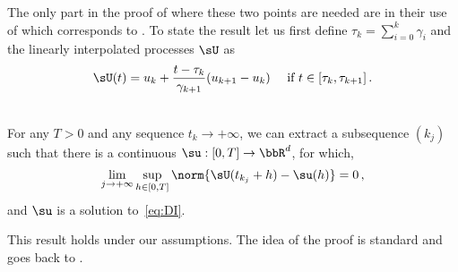 The only part in the proof of \cite[Theorem 3.2]{dav-dru-kak-lee-19} where these two points are needed are in their use of \cite[Theorem 3.1]{dav-dru-kak-lee-19} which corresponds to \cite[Theorem 3.7]{duchi2018stochastic}. To state the result let us first define $\tau_k = \sum_{i=0}^k \gamma_i$ and the linearly interpolated processes $\sU$ as 
 \begin{equation*}
  \sU(t) = u_k + \frac{t - \tau_k}{\gamma_{k+1}} (u_{k+1} - u_k) \quad \textrm{ if $t \in [\tau_k, \tau_{k+1}]$}\, .
 \end{equation*}
 \begin{proposition}\label{prop:interp_proc}
  \phantom{=}\\For any $T>0$ and any sequence $t_k \rightarrow + \infty$, we can extract a subsequence $(k_j)$ such that there is a continuous $\su : [0,T] \rightarrow \bbR^d$, for which, 
  \begin{equation*}
    \lim_{j \rightarrow + \infty}\sup_{h \in [0, T]} \norm{\sU(t_{k_j} +h) -\su(h)} = 0 \, , 
  \end{equation*}
  and $\su$ is a solution to~\eqref{eq:DI}.
 \end{proposition}
 This result holds under our assumptions. The idea of the proof is standard and goes back to \cite[Proof of Theorem 4.2]{benaim_05_DI_1}.
 
